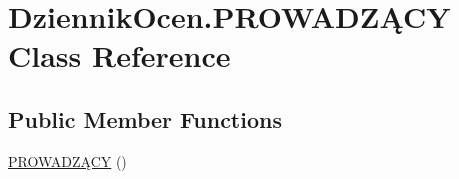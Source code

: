 \hypertarget{class_dziennik_ocen_1_1_p_r_o_w_a_d_z_xC4_x84_c_y}{}\section{Dziennik\+Ocen.\+P\+R\+O\+W\+A\+D\+ZĄ\+CY Class Reference}
\label{class_dziennik_ocen_1_1_p_r_o_w_a_d_z_xC4_x84_c_y}
\subsection*{Public Member Functions}
\begin{DoxyCompactItemize}
\item 
\hyperlink{class_dziennik_ocen_1_1_p_r_o_w_a_d_z_xC4_x84_c_y_a3cd82aab454425414fb7813d2abb8044}{P\+R\+O\+W\+A\+D\+ZĄ\+CY} ()
\end{DoxyCompactItemize}
